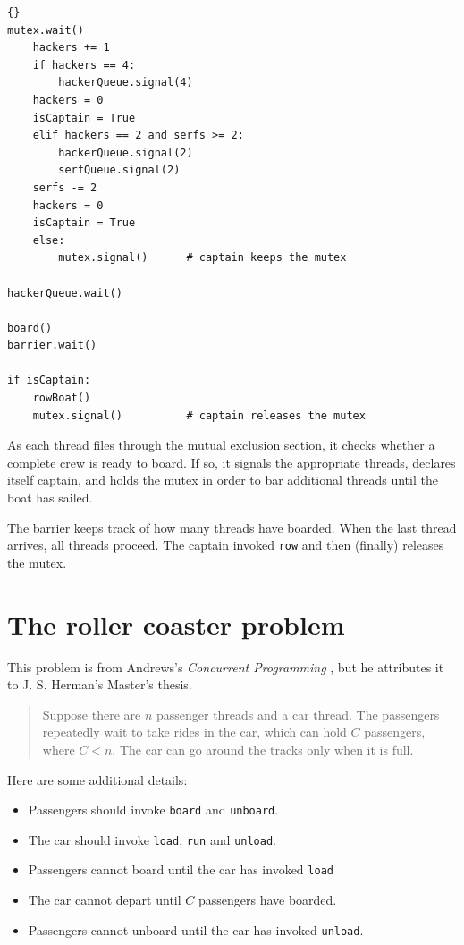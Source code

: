 \documentclass{book}
\newcommand{\clearemptydoublepage}{\newpage\cleardoublepage}
\begin{document}
\begin{latin}
\begin{latin}
\begin{lstlisting}[title={River crossing solution}]{}
mutex.wait()
    hackers += 1
    if hackers == 4:
        hackerQueue.signal(4)                
	hackers = 0
	isCaptain = True
    elif hackers == 2 and serfs >= 2:
        hackerQueue.signal(2)                
        serfQueue.signal(2)                  
	serfs -= 2
	hackers = 0
	isCaptain = True
    else:
        mutex.signal()      # captain keeps the mutex

hackerQueue.wait()           

board()
barrier.wait()            

if isCaptain:
    rowBoat()
    mutex.signal()          # captain releases the mutex
\end{lstlisting}
\end{latin}
\end{latin}

As each thread files through the mutual exclusion section, it
checks whether a complete crew is ready to board.  If so, it
signals the appropriate threads, declares itself captain, and
holds the mutex in order to bar additional threads until the
boat has sailed.

The barrier keeps track of how many threads have boarded.
When the last thread arrives, all threads proceed.
The captain invoked {\tt row} and then (finally) releases the mutex.


\clearemptydoublepage
\section{The roller coaster problem}

This problem is from Andrews's {\em Concurrent
Programming} \cite{andrews}, but he attributes it to J. S. Herman's
Master's thesis.

\begin {quotation}
Suppose there are $n$ passenger threads and a car thread.  The passengers
repeatedly wait to take rides in the car, which can hold $C$ passengers,
where $C<n$.  The car can go around the tracks only when it is full.
\end{quotation}

Here are some additional details:

\begin{itemize}

\item Passengers should invoke {\tt board} and {\tt unboard}.

\item The car should invoke {\tt load}, {\tt run} and {\tt unload}.

\item Passengers cannot board until the car has invoked {\tt load}

\item The car cannot depart until $C$ passengers have boarded.

\item Passengers cannot unboard until the car
has invoked {\tt unload}.

\end{itemize}
\end{document}
